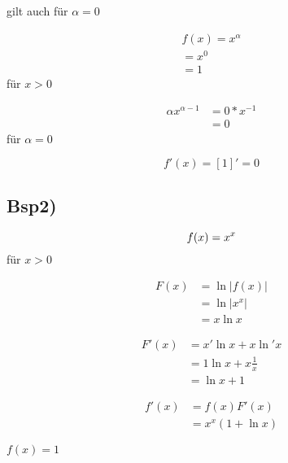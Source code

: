 \documentclass{article}
\begin{document}


gilt auch für \(\alpha = 0\)

\begin{align*}
	f(x) = x^\alpha\\
	= x^0\\
	= 1
\end{align*}
für \(x > 0\)

\begin{align*}
	\alpha x^{\alpha-1} &= 0*x^{-1}\\
	&= 0
\end{align*}
für \(\alpha = 0\)

\begin{equation*}
	f'(x) = [1]' = 0
\end{equation*}

\subsection*{Bsp2)}

\begin{equation*}
	f(x) = x^x\\
\end{equation*}
für \(x > 0\)

\begin{align*}
	F(x) &= \ln|f(x)|\\
	&= \ln|x^x|\\
	&= x\ln x
\end{align*}

\begin{align*}
	F'(x) &= x'\ln x+x\ln' x\\
	&= 1\ln x+x\frac{1}{x}\\
	&= \ln x+1
\end{align*}

\begin{align*}
	f'(x) &= f(x)F'(x)\\
	&= x^x(1+\ln x)
\end{align*}

$
	f(x) = 1
$

\end{document}
